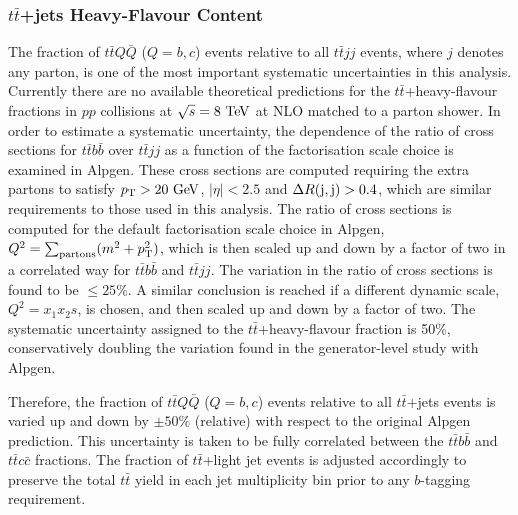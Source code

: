 \subsubsection{$t\bar{t}$+jets Heavy-Flavour Content}
\label{sec:syst_ttbarHF}
The fraction of $t\bar{t}Q\bar{Q}$ ($Q=b,c$) events relative to all $t\bar{t}jj$ events, where $j$ denotes any parton,
is one of the most important systematic uncertainties in this analysis. 
Currently there are no available theoretical predictions for the $t\bar{t}$+heavy-flavour fractions in $pp$ collisions at $\sqrt{s}=8\tev$ at NLO matched to a parton shower.
In order to estimate a systematic uncertainty, the dependence of the ratio of cross sections for $t\bar{t}b\bar{b}$ over
$t\bar{t}jj$ as a function of the factorisation scale choice is examined in {\sc Alpgen}. These cross
sections are computed requiring the extra partons to satisfy $\pt>20\gev$, $|\eta|<2.5$ and $\Delta R({\rm j},{\rm j})>0.4$, which are similar requirements
to those used in this analysis. The ratio of cross sections is computed for the default factorisation scale choice
in {\sc Alpgen}, $Q^2=\sum_{\rm partons} (m^2 + \pt^2)$, which is then scaled up and down by a factor of two
in a correlated way for $t\bar{t}b\bar{b}$ and $t\bar{t}jj$.
The variation in the ratio of cross sections is found to be $\leq 25\%$. A similar conclusion is reached if a
different dynamic scale,  $Q^2=x_1 x_2 s$, is chosen, and then scaled up and down by a factor of two.
The systematic uncertainty assigned to the $t\bar{t}$+heavy-flavour fraction is 50\%, conservatively doubling
the variation found in the generator-level study with {\sc Alpgen}. 

Therefore, the fraction of $t\bar{t}Q\bar{Q}$ ($Q=b,c$) events relative to all $t\bar{t}$+jets events
is varied up and down by $\pm 50\%$ (relative) with respect to the original {\sc Alpgen} prediction. 
This uncertainty is taken to be fully correlated between the $t\bar{t}b\bar{b}$ and $t\bar{t}c\bar{c}$ fractions.
The fraction of $t\bar{t}$+light jet events is adjusted accordingly to preserve the total $t\bar{t}$ yield in each jet multiplicity bin 
prior to any $b$-tagging requirement.

